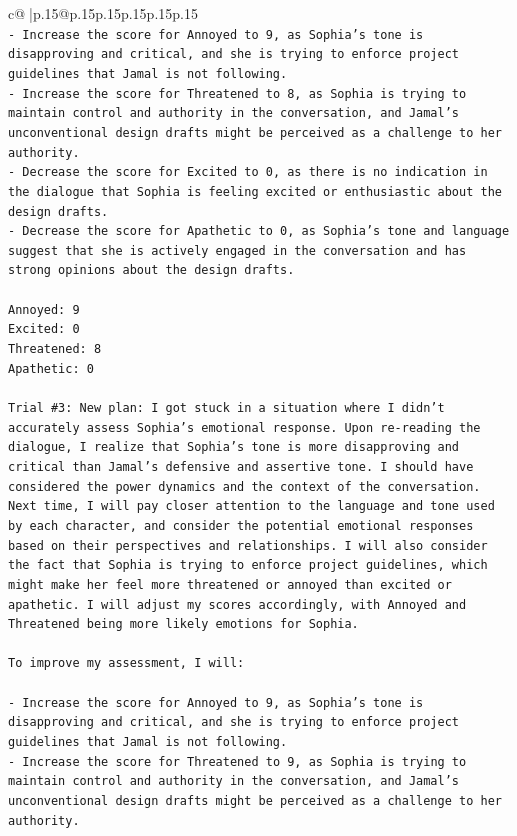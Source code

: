 \documentclass{article}
\begin{document}
{\begin{supertabular}{c@{$\;$}|p{.15\linewidth}@{}p{.15\linewidth}p{.15\linewidth}p{.15\linewidth}p{.15\linewidth}p{.15\linewidth}}
{{{\\ 
\texttt{{-} Increase the score for Annoyed to 9, as Sophia's tone is disapproving and critical, and she is trying to enforce project guidelines that Jamal is not following.} \\
\texttt{{-} Increase the score for Threatened to 8, as Sophia is trying to maintain control and authority in the conversation, and Jamal's unconventional design drafts might be perceived as a challenge to her authority.} \\
\texttt{{-} Decrease the score for Excited to 0, as there is no indication in the dialogue that Sophia is feeling excited or enthusiastic about the design drafts.} \\
\texttt{{-} Decrease the score for Apathetic to 0, as Sophia's tone and language suggest that she is actively engaged in the conversation and has strong opinions about the design drafts.} \\
\\ 
\texttt{Annoyed: 9} \\
\texttt{Excited: 0} \\
\texttt{Threatened: 8} \\
\texttt{Apathetic: 0} \\
\\ 
\texttt{Trial \#3: New plan: I got stuck in a situation where I didn't accurately assess Sophia's emotional response. Upon re{-}reading the dialogue, I realize that Sophia's tone is more disapproving and critical than Jamal's defensive and assertive tone. I should have considered the power dynamics and the context of the conversation. Next time, I will pay closer attention to the language and tone used by each character, and consider the potential emotional responses based on their perspectives and relationships. I will also consider the fact that Sophia is trying to enforce project guidelines, which might make her feel more threatened or annoyed than excited or apathetic. I will adjust my scores accordingly, with Annoyed and Threatened being more likely emotions for Sophia.} \\
\\ 
\texttt{To improve my assessment, I will:} \\
\\ 
\texttt{{-} Increase the score for Annoyed to 9, as Sophia's tone is disapproving and critical, and she is trying to enforce project guidelines that Jamal is not following.} \\
\texttt{{-} Increase the score for Threatened to 9, as Sophia is trying to maintain control and authority in the conversation, and Jamal's unconventional design drafts might be perceived as a challenge to her authority.} \\
}}}
\end{supertabular}}
\end{document}
